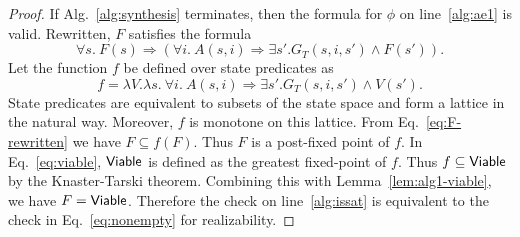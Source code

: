 \begin{proof}
If Alg.~\ref{alg:synthesis} terminates, then the
formula for $\phi$ on line~\ref{alg:ae1} is valid. Rewritten, $F$
satisfies the formula
\begin{equation}
  \forall s.~F(s) \Rightarrow \left(\forall i.~ A(s,i) \Rightarrow \exists
    s'.G_{T}(s,i,s') \land F(s')\right).
  \label{eq:F-rewritten}
\end{equation}
Let the function $f$ be defined over state predicates as
  \begin{equation}
    f = \lambda V. \lambda s.~ \forall i.~ A(s,i) \Rightarrow \exists s'.G_{T}(s,i,s') \land V(s').
    \label{eq:f-fixed-point}
  \end{equation}
  State predicates are equivalent to subsets of the state space and
  form a lattice in the natural way. Moreover, $f$ is monotone on this
  lattice. From Eq.~\ref{eq:F-rewritten} we have
  $F \subseteq f(F)$. Thus $F$ is a post-fixed point of $f$. In
  Eq.~\ref{eq:viable}, ${\mathsf {Viable}}$ is defined as the greatest
  fixed-point of $f$. Thus $f \subseteq {\mathsf {Viable}}$ by the Knaster-Tarski
  theorem. Combining this with Lemma~\ref{lem:alg1-viable}, we have
  $F = {\mathsf {Viable}}$. Therefore the check on line~\ref{alg:issat} is equivalent to the
  check in Eq.~\ref{eq:nonempty} for realizability.
\end{proof}

